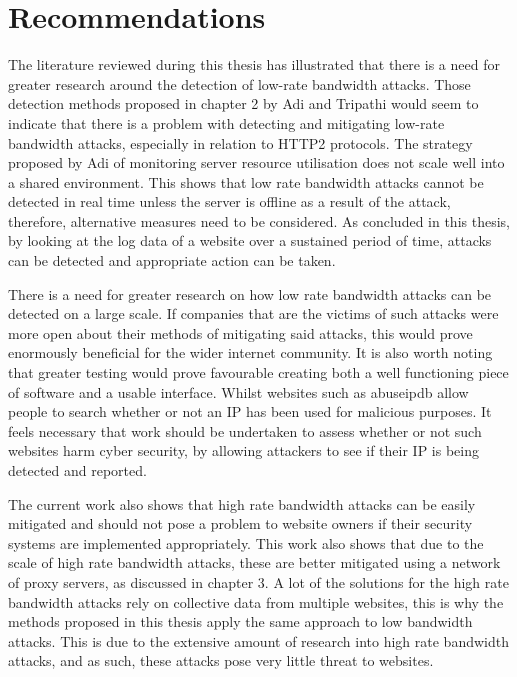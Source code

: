 \section{Recommendations}


The literature reviewed during this thesis has illustrated that there is a need for greater research around the detection of low-rate bandwidth attacks. Those detection methods proposed in chapter 2 by Adi and Tripathi would seem to indicate that there is a problem with detecting and mitigating low-rate bandwidth attacks, especially in relation to HTTP2 protocols. The strategy proposed by Adi of monitoring server resource utilisation does not scale well into a shared environment. This shows that low rate bandwidth attacks cannot be detected in real time unless the server is offline as a result of the attack, therefore, alternative measures need to be considered. As concluded in this thesis, by looking at the log data of a website over a sustained period of time, attacks can be detected and appropriate action can be taken.

There is a need for greater research  on how low rate bandwidth attacks can be detected on a large scale. If companies that are the victims of such attacks were more open about their methods of mitigating said attacks, this would prove enormously beneficial for the wider internet community. It is also worth noting that greater testing would prove favourable creating both a well functioning piece of software and a usable interface. Whilst websites such as abuseipdb allow people to search whether or not an IP has been used for malicious purposes. It feels necessary that work should be undertaken to assess whether or not such websites harm cyber security, by allowing attackers to see if their IP is being detected and reported.

The current work also shows that high rate bandwidth attacks can be easily mitigated and should not pose a problem to website owners if their security systems are implemented appropriately. This work also shows that due to the scale of high rate bandwidth attacks, these are better mitigated using a network of proxy servers, as discussed in chapter 3. A lot of the solutions for the high rate bandwidth attacks rely on collective data from multiple websites, this is why the methods proposed in this thesis apply the same approach to low bandwidth attacks. This is due to the extensive amount of research into high rate bandwidth attacks, and as such, these attacks pose very little threat to websites. 

